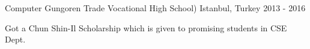 

\begin{cventries}

  \cventry
    {Computer} %
    {Gungoren Trade Vocational High School)} %
    {Istanbul, Turkey} %
    {2013 - 2016} %
    {
      \begin{cvitems} %
        \item {Got a Chun Shin-Il Scholarship which is given to promising students in CSE Dept.}
      \end{cvitems}
    }

\end{cventries}
